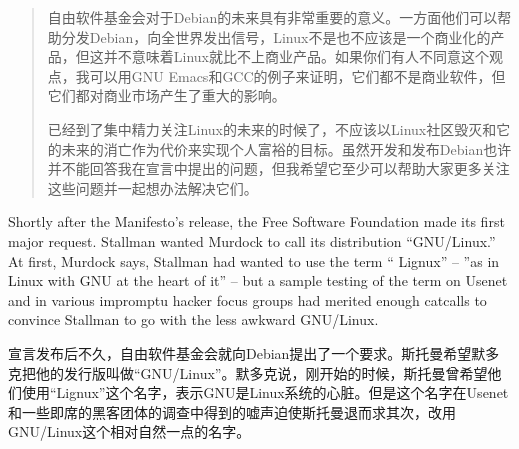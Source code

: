 \ifdefined\chs
\begin{quote}
自由软件基金会对于Debian的未来具有非常重要的意义。一方面他们可以帮助分发Debian，向全世界发出信号，Linux不是也不应该是一个商业化的产品，但这并不意味着Linux就比不上商业产品。如果你们有人不同意这个观点，我可以用GNU Emacs和GCC的例子来证明，它们都不是商业软件，但它们都对商业市场产生了重大的影响。

已经到了集中精力关注Linux的未来的时候了，不应该以Linux社区毁灭和它的未来的消亡作为代价来实现个人富裕的目标。虽然开发和发布Debian也许并不能回答我在宣言中提出的问题，但我希望它至少可以帮助大家更多关注这些问题并一起想办法解决它们。
\end{quote}
\fi

\ifdefined\eng
Shortly after the Manifesto's release, the Free Software Foundation made its first major request. Stallman wanted Murdock to call its distribution ``GNU/Linux.'' At first, Murdock says, Stallman had wanted to use the term `` Lignux'' -- ''as in Linux with GNU at the heart of it'' -- but a sample testing of the term on Usenet and in various impromptu hacker focus groups had merited enough catcalls to convince Stallman to go with the less awkward GNU/Linux.
\fi

\ifdefined\chs
宣言发布后不久，自由软件基金会就向Debian提出了一个要求。斯托曼希望默多克把他的发行版叫做``GNU/Linux''。默多克说，刚开始的时候，斯托曼曾希望他们使用``Lignux''这个名字，表示GNU是Linux系统的心脏。但是这个名字在Usenet和一些即席的黑客团体的调查中得到的嘘声迫使斯托曼退而求其次，改用GNU/Linux这个相对自然一点的名字。
\fi


